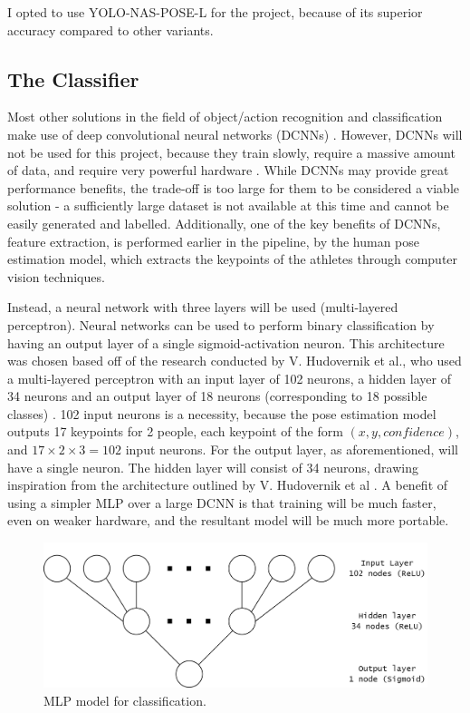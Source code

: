 \documentclass[a4paper, oneside, 11pt]{article}
\begin{document}
\bigskip
\noindent
I opted to use YOLO-NAS-POSE-L for the project, because of its superior accuracy compared to other variants.


\subsection{The Classifier}

Most other solutions in the field of object/action recognition and classification make use of deep convolutional neural networks (DCNNs) \cite{DCNN}. However, DCNNs will not be used for this project, because they train slowly, require a massive amount of data, and require very powerful hardware \cite{DCNNDisadvantages}. While DCNNs may provide great performance benefits, the trade-off is too large for them to be considered a viable solution - a sufficiently large dataset is not available at this time and cannot be easily generated and labelled. Additionally, one of the key benefits of DCNNs, feature extraction, is performed earlier in the pipeline, by the human pose estimation model, which extracts the keypoints of the athletes through computer vision techniques.

\bigskip
\noindent
Instead, a neural network with three layers will be used (multi-layered perceptron). Neural networks can be used to perform binary classification by having an output layer of a single sigmoid-activation neuron. This architecture was chosen based off of the research conducted by V. Hudovernik et al., who used a multi-layered perceptron with an input layer of 102 neurons, a hidden layer of 34 neurons and an output layer of 18 neurons (corresponding to 18 possible classes) \cite{IdentifyingBJJPositions}. 102 input neurons is a necessity, because the pose estimation model outputs 17 keypoints for 2 people, each keypoint of the form $(x, y,  \textit{confidence})$, and $17 \times 2 \times 3 = 102$ input neurons. For the output layer, as aforementioned, will have a single neuron. The hidden layer will consist of 34 neurons, drawing inspiration from the architecture outlined by V. Hudovernik et al \cite{IdentifyingBJJPositions}. A benefit of using a simpler MLP over a large DCNN is that training will be much faster, even on weaker hardware, and the resultant model will be much more portable. 

\begin{figure}[ht]
    \centering
    \includegraphics[scale = 0.25]{img/MLP.drawio.png}
    \caption{MLP model for classification.}
    \label{fig:MLPdiagram}
\end{figure}
\end{document}
